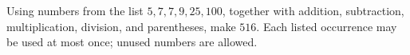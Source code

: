 Using numbers from the list $5,7,7,9,25,100$, together with addition, subtraction, multiplication, division, and parentheses, make $516$. Each listed occurrence may be used at most once; unused numbers are allowed.
